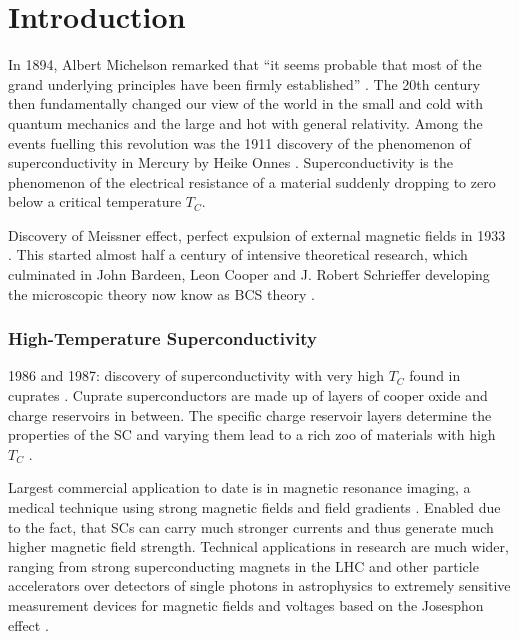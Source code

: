 \documentclass[../notes.tex]{subfiles}
\begin{document}
\raggedbottom
	
\chapter{Introduction}

In 1894, Albert Michelson remarked that \enquote{it seems probable that most of the grand underlying principles have been firmly established}  \cite[p. 159]{chicagoAnnualRegister1896}.
The 20th century then fundamentally changed our view of the world in the small and cold with quantum mechanics and the large and hot with general relativity.
Among the events fuelling this revolution was the 1911 discovery of the phenomenon of superconductivity in Mercury by Heike Onnes \cite{onnesFurtherExperimentsLiquid1991}.
Superconductivity is the phenomenon of the electrical resistance of a material suddenly dropping to zero below a critical temperature \(T_C\).

Discovery of Meissner effect, perfect expulsion of external magnetic fields in 1933 \cite{meissnerNeuerEffektBei1933}.
This started almost half a century of intensive theoretical research, which culminated in John Bardeen, Leon Cooper and J. Robert Schrieffer developing the microscopic theory now know as BCS theory \cite{bardeenTheorySuperconductivity1957}.

\subsection*{High-Temperature Superconductivity}

1986 and 1987: discovery of superconductivity with very high \(T_C\) found in cuprates \cite{bednorzPossibleHighTc1986,uchidaHighTcSuperconductivity1987}.
Cuprate superconductors are made up of layers of cooper oxide and charge reservoirs in between.
The specific charge reservoir layers determine the properties of the SC and varying them lead to a rich zoo of materials with high \(T_C\)  \cite{rybickiPerspectivePhaseDiagram2016}.

Largest commercial application to date is in magnetic resonance imaging, a medical technique using strong magnetic fields and field gradients \cite{rinckMagneticResonanceMedicine}.
Enabled due to the fact, that SCs can carry much stronger currents and thus generate much higher magnetic field strength.
Technical applications in research are much wider, ranging from strong superconducting magnets in the LHC \cite{tollestrupDevelopmentSuperconductingMagnets2008, rossiParticleAcceleratorsCuprate2023} and other particle accelerators over detectors of single photons in astrophysics \cite{irwinTransitionEdgeSensors2005} to extremely sensitive measurement devices for magnetic fields \cite{faleyHighTcSQUIDBiomagnetometers2017} and voltages \cite{klushinPresentFutureHightemperature2020} based on the Josesphon effect \cite{josephsonPossibleNewEffects1962}.
\end{document}
